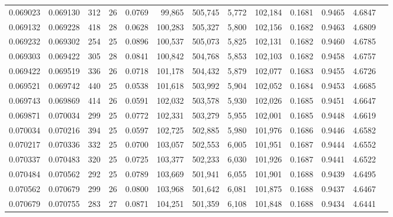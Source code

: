 \begin{tabular}{rrrrrrrrrrrrr}
0.069023 & 0.069130 & 312 &  26 &                                     0.0769 &  99,865 & 505,745 &   5,772 & 102,184 & 0.1681 & 0.9465 & 4.6847 \\
0.069132 & 0.069228 & 418 &  28 &                                     0.0628 & 100,283 & 505,327 &   5,800 & 102,156 & 0.1682 & 0.9463 & 4.6809 \\
0.069232 & 0.069302 & 254 &  25 &                                     0.0896 & 100,537 & 505,073 &   5,825 & 102,131 & 0.1682 & 0.9460 & 4.6785 \\
0.069303 & 0.069422 & 305 &  28 &                                     0.0841 & 100,842 & 504,768 &   5,853 & 102,103 & 0.1682 & 0.9458 & 4.6757 \\
0.069422 & 0.069519 & 336 &  26 &                                     0.0718 & 101,178 & 504,432 &   5,879 & 102,077 & 0.1683 & 0.9455 & 4.6726 \\
0.069521 & 0.069742 & 440 &  25 &                                     0.0538 & 101,618 & 503,992 &   5,904 & 102,052 & 0.1684 & 0.9453 & 4.6685 \\
0.069743 & 0.069869 & 414 &  26 &                                     0.0591 & 102,032 & 503,578 &   5,930 & 102,026 & 0.1685 & 0.9451 & 4.6647 \\
0.069871 & 0.070034 & 299 &  25 &                                     0.0772 & 102,331 & 503,279 &   5,955 & 102,001 & 0.1685 & 0.9448 & 4.6619 \\
0.070034 & 0.070216 & 394 &  25 &                                     0.0597 & 102,725 & 502,885 &   5,980 & 101,976 & 0.1686 & 0.9446 & 4.6582 \\
0.070217 & 0.070336 & 332 &  25 &                                     0.0700 & 103,057 & 502,553 &   6,005 & 101,951 & 0.1687 & 0.9444 & 4.6552 \\
0.070337 & 0.070483 & 320 &  25 &                                     0.0725 & 103,377 & 502,233 &   6,030 & 101,926 & 0.1687 & 0.9441 & 4.6522 \\
0.070484 & 0.070562 & 292 &  25 &                                     0.0789 & 103,669 & 501,941 &   6,055 & 101,901 & 0.1688 & 0.9439 & 4.6495 \\
0.070562 & 0.070679 & 299 &  26 &                                     0.0800 & 103,968 & 501,642 &   6,081 & 101,875 & 0.1688 & 0.9437 & 4.6467 \\
0.070679 & 0.070755 & 283 &  27 &                                     0.0871 & 104,251 & 501,359 &   6,108 & 101,848 & 0.1688 & 0.9434 & 4.6441 \\

\end{tabular}
